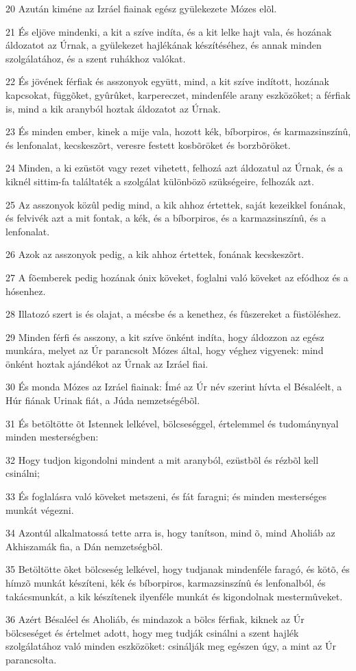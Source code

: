 \par 20 Azután kiméne az Izráel fiainak egész gyülekezete Mózes elõl.
\par 21 És eljöve mindenki, a kit a szíve indíta, és a kit lelke hajt vala, és hozának áldozatot az Úrnak, a gyülekezet hajlékának készítéséhez, és annak minden szolgálatához, és a szent ruhákhoz valókat.
\par 22 És jövének férfiak és asszonyok együtt, mind, a kit szíve indított, hozának kapcsokat, függõket, gyûrûket, karpereczet, mindenféle arany eszközöket; a férfiak is, mind a kik aranyból hoztak áldozatot az Úrnak.
\par 23 És minden ember, kinek a mije vala, hozott kék, bíborpiros, és karmazsinszínû, és lenfonalat, kecskeszõrt, veresre festett kosbõröket és borzbõröket.
\par 24 Minden, a ki ezüstöt vagy rezet vihetett, felhozá azt áldozatul az Úrnak, és a kiknél sittim-fa találtaték a szolgálat különbözõ szükségeire, felhozák azt.
\par 25 Az asszonyok közûl pedig mind, a kik ahhoz értettek, saját kezeikkel fonának, és felvivék azt a mit fontak, a kék, és a bíborpiros, és a karmazsinszínû, és a lenfonalat.
\par 26 Azok az asszonyok pedig, a kik ahhoz értettek, fonának kecskeszõrt.
\par 27 A fõemberek pedig hozának ónix köveket, foglalni való köveket az efódhoz és a hósenhez.
\par 28 Illatozó szert is és olajat, a mécsbe és a kenethez, és fûszereket a füstöléshez.
\par 29 Minden férfi és asszony, a kit szíve önként indíta, hogy áldozzon az egész munkára, melyet az Úr parancsolt Mózes által, hogy véghez vigyenek: mind önként hoztak ajándékot az Úrnak az Izráel fiai.
\par 30 És monda Mózes az Izráel fiainak: Ímé az Úr név szerint hívta el Bésaléelt, a Húr fiának Urinak fiát, a Júda nemzetségébõl.
\par 31 És betöltötte õt Istennek lelkével, bölcseséggel, értelemmel és tudománynyal minden mesterségben:
\par 32 Hogy tudjon kigondolni mindent a mit aranyból, ezüstbõl és rézbõl kell csinálni;
\par 33 És foglalásra való köveket metszeni, és fát faragni; és minden mesterséges munkát végezni.
\par 34 Azontúl alkalmatossá tette arra is, hogy tanítson, mind õ, mind Aholiáb az Akhiszamák fia, a Dán nemzetségbõl.
\par 35 Betöltötte õket bölcseség lelkével, hogy tudjanak mindenféle faragó, és kötõ, és hímzõ munkát készíteni, kék és bíborpiros, karmazsinszínû és lenfonalból, és takácsmunkát, a kik készítenek ilyenféle munkát és kigondolnak mestermûveket.
\par 36 Azért Bésaléel és Aholiáb, és mindazok a bölcs férfiak, kiknek az Úr bölcseséget és értelmet adott, hogy meg tudják csinálni a szent hajlék szolgálatához való minden eszközöket: csinálják meg egészen úgy, a mint az Úr parancsolta.


